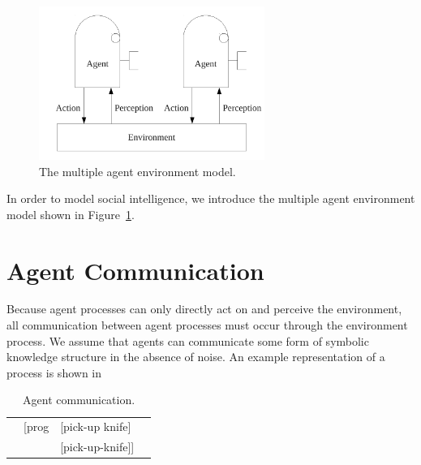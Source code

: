 \begin{figure}[bth]
  \center
  \includegraphics[height=5cm]{gfx/multiple_agent_environment}
  \caption[The multiple agent environment model]{The multiple agent environment model.}
  \label{fig:multiple_agent_environment}
\end{figure}

In order to model social intelligence, we introduce the multiple agent
environment model shown in
Figure~\ref{fig:multiple_agent_environment}.


\section{Agent Communication}

Because agent processes can only directly act on and perceive the
environment, all communication between agent processes must occur
through the environment process.  We assume that agents can
communicate some form of symbolic knowledge structure in the absence
of noise.  An example representation of a process is shown in


\begin{table}
    \myfloatalign
  \begin{tabularx}{\textwidth}{XllX}
    & [prog & [pick-up knife]  & \\
    &       & [pick-up-knife]] & \\
  \end{tabularx}
  \caption[Agent communication]{Agent communication.}
  \label{tab:agent_communication}
\end{table}
